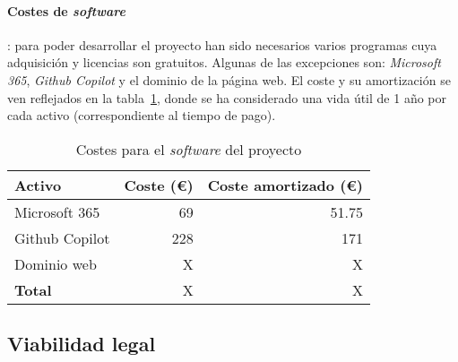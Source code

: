 \paragraph{Costes de \textit{software}}: para poder desarrollar el proyecto han sido necesarios varios programas cuya adquisición y licencias son gratuitos. Algunas de las excepciones son: \textit{Microsoft 365}, \textit{Github Copilot} y el dominio de la página web. El coste y su amortización se ven reflejados en la tabla~\ref{tabla:sw}, donde se ha considerado una vida útil de 1 año por cada activo (correspondiente al tiempo de pago).

\begin{table}[H]
	\centering
	\begin{tabular}{lrr}
		\toprule
		\textbf{Activo}      & \textbf{Coste (€)}      & \textbf{Coste amortizado (€)}      \\ \midrule
		Microsoft 365     & 69                    & 51.75                      \\
		Github Copilot			& 228 						& 171							\\
		Dominio web             & X                    &  X                     \\ \midrule
		\textbf{Total}       & X                   &  X                     \\ \midrule
	\end{tabular}
	\caption{Costes para el \textit{software} del proyecto}
	\label{tabla:sw}
\end{table}


\subsection{Viabilidad legal}

